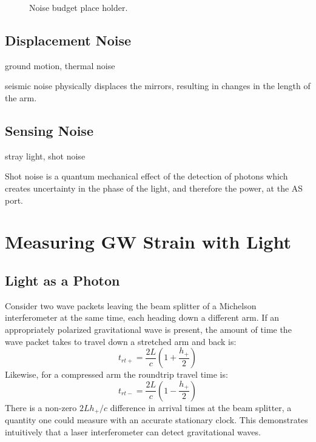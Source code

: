 \begin{figure}
\begin{centering}
\caption[LIGO noise budget]{Noise budget place holder.}
\label{fig:NB}
\end{centering}
\end{figure}


\subsection{Displacement Noise} 
ground motion, thermal noise

seismic noise physically displaces the mirrors, resulting in changes in the length
of the arm. 

\subsection{Sensing Noise}
stray light, shot noise

Shot noise is a quantum mechanical effect of the detection
of photons which creates uncertainty in the phase of the light, and
therefore the power, at the AS port.




\section{Measuring GW Strain with Light}
\subsection{Light as a Photon} 
Consider two wave packets leaving the beam splitter of a Michelson
interferometer at the same time, each heading down a different arm. If
an appropriately polarized gravitational wave is present, the amount
of time the wave packet takes to travel down a stretched arm and back
is:
\begin{equation}
\label{eq:trt+} 
t_{rt+} = \frac{2 L}{c} \left( 1 + \frac{h_+}{2} \right)
\end{equation}
Likewise, for a compressed arm the roundtrip travel time is:
\begin{equation}
\label{eq:trt-} 
t_{rt-} = \frac{2 L}{c} \left( 1 - \frac{h_+}{2} \right)
\end{equation}
There is a non-zero $2Lh_+/c$ difference in arrival times at the beam splitter, a quantity
one could measure with an accurate stationary clock. This demonstrates intuitively that
a laser interferometer can detect gravitational waves.

